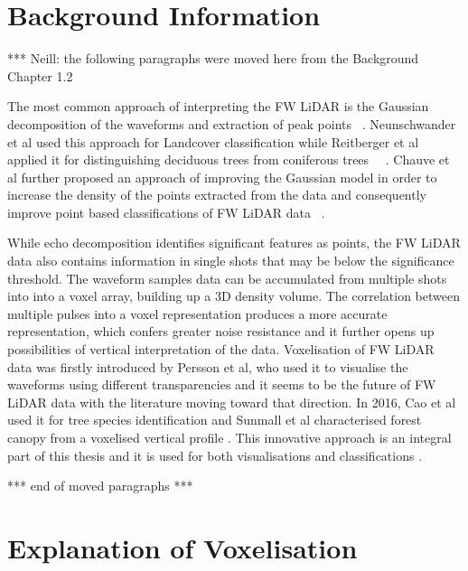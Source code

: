 \documentclass{subfiles}
\begin{document}
\section{Background Information}
		\par {\color{red} *** Neill: the following paragraphs were moved here from the Background Chapter 1.2}
		
		\par The most common approach of interpreting the FW LiDAR is the Gaussian decomposition of the waveforms and extraction of peak points ~\cite{Wanger2006}. Neunschwander et al used this approach for Landcover classification while Reitberger et al applied it for distinguishing deciduous trees from coniferous trees ~\cite{Neuenschwander2009}~\cite{Reitberger2008}. Chauve et al further proposed an approach of improving the Gaussian model in order to increase the density of the points extracted from the data and consequently improve point based classifications of FW LiDAR data ~\cite{Chauve2007}. 
		
		\par While echo decomposition identifies significant features as points, the FW LiDAR data also contains information in single shots that may be below the significance threshold. The waveform samples data can be accumulated from multiple shots into {\color{blue} into a voxel array, building up a 3D density volume. The correlation between multiple pulses into a voxel representation produces a more accurate representation, which confers greater noise resistance and it further opens up possibilities of vertical interpretation of the data.} Voxelisation {\color{blue} of FW LiDAR data} was firstly introduced by Persson et al, who used it to visualise the waveforms using different transparencies \cite{Persson2005} and it seems to be the future of FW LiDAR data with the literature moving toward that direction. In 2016, Cao et al used it for tree species identification \cite{Cao2016} and Sunmall et al characterised forest canopy from a voxelised vertical profile \cite{Sumnall2016}. This innovative approach is an integral part of this thesis and it is used for both visualisations and classifications \cite{Miltiadou2014}\cite{Miltiadou2015}. 
		\par {\color{red} *** end of moved paragraphs *** }
		
		

	
\section{Explanation of Voxelisation}
\end{document}
